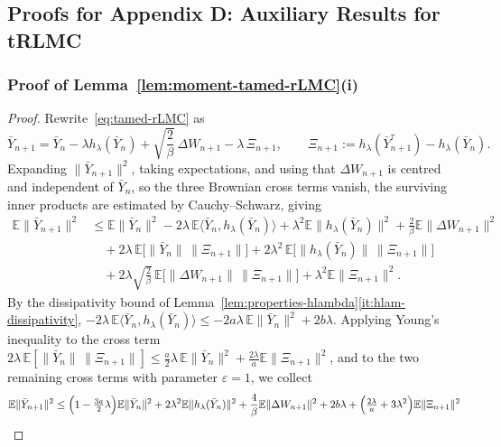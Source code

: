 \documentclass[11pt,a4paper,reqno]{amsart}
\theoremstyle{plain}
\theoremstyle{definition}
\theoremstyle{remark}
\newcommand{\E}{\mathbb{E}}
\begin{document}
\subsection{Proofs for Appendix D: Auxiliary Results for tRLMC}


\subsubsection{Proof of Lemma~\ref{lem:moment-tamed-rLMC}(i)}
\label{subsec:proof-uniform-moments-tamed-rLMC}
\begin{proof}
Rewrite~\eqref{eq:tamed-rLMC} as
\begin{equation}\label{eq:tamed-rLMC-recast}
  \bar Y_{n+1}
  =
  \bar Y_n-\lambda h_\lambda(\bar Y_n)
  +\sqrt{\frac{2}{\beta}}\,\Delta W_{n+1}
  -\lambda\,\Xi_{n+1},
  \qquad
  \Xi_{n+1}:=h_\lambda(\bar Y_{n+1}^{\tau})-h_\lambda(\bar Y_n).
\end{equation}
Expanding $\|\bar Y_{n+1}\|^2$, taking expectations, and using that
$\Delta W_{n+1}$ is centred and independent of $\bar Y_n$, so the three
Brownian cross terms vanish, the surviving inner products are estimated by
Cauchy--Schwarz, giving
\begin{align}
  \E\|\bar Y_{n+1}\|^2
  &\le
  \E\|\bar Y_n\|^2
  -2\lambda\,\E\langle \bar Y_n,h_\lambda(\bar Y_n)\rangle
  +\lambda^2\E\|h_\lambda(\bar Y_n)\|^2
  +\frac{2}{\beta}\E\|\Delta W_{n+1}\|^2
  \nonumber\\
  &\quad
  +2\lambda\,\E\bigl[\|\bar Y_n\|\,\|\Xi_{n+1}\|\bigr]
  +2\lambda^2\,\E\bigl[\|h_\lambda(\bar Y_n)\|\,\|\Xi_{n+1}\|\bigr]
  \nonumber\\
  &\quad
  +2\lambda\sqrt{\frac{2}{\beta}}\,\E\bigl[\|\Delta W_{n+1}\|\,\|\Xi_{n+1}\|\bigr]
  +\lambda^2\E\|\Xi_{n+1}\|^2 .
  \label{eq:tamed-moment-expand}
\end{align}
By the dissipativity bound of Lemma~\ref{lem:properties-hlambda}\ref{it:hlam-dissipativity},
$-2\lambda\,\E\langle\bar Y_n,h_\lambda(\bar Y_n)\rangle\le-2a\lambda\,\E\|\bar Y_n\|^2+2b\lambda$.
Applying Young's inequality to the cross term
$2\lambda\,\E[\|\bar Y_n\|\,\|\Xi_{n+1}\|]
\le\tfrac{a}{2}\lambda\,\E\|\bar Y_n\|^2+\tfrac{2\lambda}{a}\E\|\Xi_{n+1}\|^2$,
and to the two remaining cross terms with parameter $\varepsilon=1$, we collect
\begin{equation}\label{eq:tamed-moment-prelim}
  \E\|\bar Y_{n+1}\|^2
  \le
  \Bigl(1-\tfrac{3a}{2}\lambda\Bigr)\E\|\bar Y_n\|^2
  +2\lambda^2\E\|h_\lambda(\bar Y_n)\|^2
  +\frac{4}{\beta}\E\|\Delta W_{n+1}\|^2
  +2b\lambda
  +\Bigl(\tfrac{2\lambda}{a}+3\lambda^2\Bigr)\E\|\Xi_{n+1}\|^2
\end{equation}



\end{proof}
\end{document}
